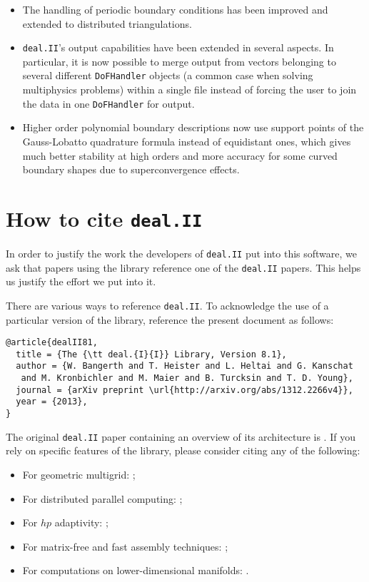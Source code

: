 \documentclass{siamltex}
\newcommand{\specialword}[1]{\texttt{#1}}
\newcommand{\dealii}{{\specialword{deal.II}}}
\begin{document}
\begin{itemize}
\item The handling of periodic boundary conditions has been improved and extended
  to distributed triangulations.
\item \dealii{}'s output capabilities have been extended in several
  aspects. In particular, it is now possible to merge output from vectors
  belonging to several different \texttt{DoFHandler} objects (a common case
  when solving multiphysics problems) within a single file instead of forcing
  the user to join the data in one \texttt{DoFHandler} for output.
\item Higher order polynomial boundary descriptions now use support points of
  the Gauss-Lobatto quadrature formula instead of equidistant ones, which
  gives much better stability at high orders and more accuracy for some curved
  boundary shapes due to superconvergence effects.
\end{itemize}



\section{How to cite \dealii{}}\label{sec:cite}

In order to justify the work the developers of \dealii{} put into this
software, we ask that papers using the library reference one of the \dealii{}
papers. This helps us justify the effort we put into it.

There are various ways to reference \dealii{}. To acknowledge the use of a
particular version of the library, reference the present document as follows:
\begin{verbatim}
@article{dealII81,
  title = {The {\tt deal.{I}{I}} Library, Version 8.1},
  author = {W. Bangerth and T. Heister and L. Heltai and G. Kanschat
   and M. Kronbichler and M. Maier and B. Turcksin and T. D. Young},
  journal = {arXiv preprint \url{http://arxiv.org/abs/1312.2266v4}},
  year = {2013},
}
\end{verbatim}

The original \texttt{\dealii{}} paper containing an overview of its
architecture is \cite{BangerthHartmannKanschat2007}. If you rely on specific
features of the library, please consider citing any of the following:
\begin{itemize}
 \item For geometric multigrid: \cite{Kanschat2004,JanssenKanschat2011};
 \item For distributed parallel computing: \cite{BangerthBursteddeHeisterKronbichler11};
 \item For $hp$ adaptivity: \cite{BangerthKayserHerold2007};
 \item For matrix-free and fast assembly techniques:
   \cite{KronbichlerKormann2012};
 \item For computations on lower-dimensional manifolds:
   \cite{DeSimoneHeltaiManigrasso2009}.
\end{itemize}
\end{document}
